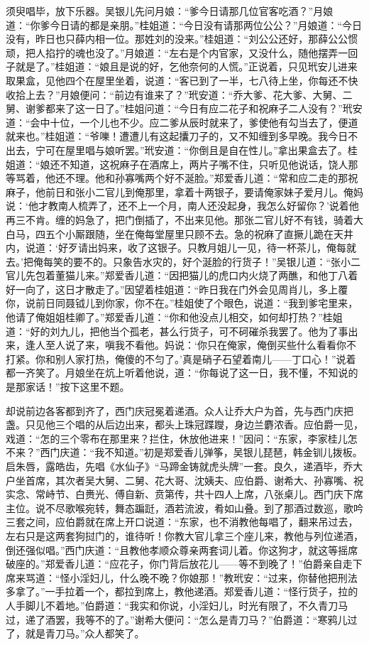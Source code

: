 须臾唱毕，放下乐器。吴银儿先问月娘：“爹今日请那几位官客吃酒？”月娘道：“你爹今日请的都是亲朋。”桂姐道：“今日没有请那两位公公？”月娘道：“今日没有，昨日也只薛内相一位。那姓刘的没来。”桂姐道：“刘公公还好，那薛公公惯顽，把人掐拧的魂也没了。”月娘道：“左右是个内官家，又没什么，随他摆弄一回子就是了。”桂姐道：“娘且是说的好，乞他奈何的人慌。”正说着，只见玳安儿进来取果盒，见他四个在屋里坐着，说道：“客已到了一半，七八待上坐，你每还不快收拾上去？”月娘便问：“前边有谁来了？”玳安道：“乔大爹、花大爹、大舅、二舅、谢爹都来了这一日了。”桂姐问道：“今日有应二花子和祝麻子二人没有？”玳安道：“会中十位，一个儿也不少。应二爹从辰时就来了，爹使他有勾当去了，便道就来也。”桂姐道：“爷嚛！遭遭儿有这起攮刀子的，又不知缠到多早晚。我今日不出去，宁可在屋里唱与娘听罢。”玳安道：“你倒且是自在性儿。”拿出果盒去了。桂姐道：“娘还不知道，这祝麻子在酒席上，两片子嘴不住，只听见他说话，饶人那等骂着，他还不理。他和孙寡嘴两个好不涎脸。”郑爱香儿道：“常和应二走的那祝麻子，他前日和张小二官儿到俺那里，拿着十两银子，要请俺家妹子爱月儿。俺妈说：‘他才教南人梳弄了，还不上一个月，南人还没起身，我怎么好留你？’说着他再三不肯。缠的妈急了，把门倒插了，不出来见他。那张二官儿好不有钱，骑着大白马，四五个小厮跟随，坐在俺每堂屋里只顾不去。急的祝麻了直撅儿跪在天井内，说道：‘好歹请出妈来，收了这银子。只教月姐儿一见，待一杯茶儿，俺每就去。’把俺每笑的要不的。只象告水灾的，好个涎脸的行货子！”吴银儿道：“张小二官儿先包着董猫儿来。”郑爱香儿道：“因把猫儿的虎口内火烧了两醮，和他丁八着好一向了，这日才散走了。”因望着桂姐道：“昨日我在门外会见周肖儿，多上覆你，说前日同聂钺儿到你家，你不在。”桂姐使了个眼色，说道：“我到爹宅里来，他请了俺姐姐桂卿了。”郑爱香儿道：“你和他没点儿相交，如何却打热？”桂姐道：“好的刘九儿，把他当个孤老，甚么行货子，可不砢磪杀我罢了。他为了事出来，逢人至人说了来，嗔我不看他。妈说：‘你只在俺家，俺倒买些什么看看你不打紧。你和别人家打热，俺傻的不匀了。’真是硝子石望着南儿——丁口心！”说着都一齐笑了。月娘坐在炕上听着他说，道：“你每说了这一日，我不懂，不知说的是那家话！”按下这里不题。

却说前边各客都到齐了，西门庆冠冕着递酒。众人让乔大户为首，先与西门庆把盏。只见他三个唱的从后边出来，都头上珠冠蹀躞，身边兰麝浓香。应伯爵一见，戏道：“怎的三个零布在那里来？拦住，休放他进来！”因问：“东家，李家桂儿怎不来？”西门庆道：“我不知道。”初是郑爱香儿弹筝，吴银儿琵琶，韩金钏儿拨板。启朱唇，露皓齿，先唱《水仙子》“马蹄金铸就虎头牌”一套。良久，递酒毕，乔大户坐首席，其次者吴大舅、二舅、花大哥、沈姨夫、应伯爵、谢希大、孙寡嘴、祝实念、常峙节、白赉光、傅自新、贲第传，共十四人上席，八张桌儿。西门庆下席主位。说不尽歌喉宛转，舞态蹁跹，酒若流波，肴如山叠。到了那酒过数巡，歌吟三套之间，应伯爵就在席上开口说道：“东家，也不消教他每唱了，翻来吊过去，左右只是这两套狗挝门的，谁待听！你教大官儿拿三个座儿来，教他与列位递酒，倒还强似唱。”西门庆道：“且教他孝顺众尊亲两套词儿着。你这狗才，就这等摇席破座的。”郑爱香儿道：“应花子，你门背后放花儿——等不到晚了！”伯爵亲自走下席来骂道：“怪小淫妇儿，什么晚不晚？你娘那！”教玳安：“过来，你替他把刑法多拿了。”一手拉着一个，都拉到席上，教他递酒。郑爱香儿道：“怪行货子，拉的人手脚儿不着地。”伯爵道：“我实和你说，小淫妇儿，时光有限了，不久青刀马过，递了酒罢，我等不的了。”谢希大便问：“怎么是青刀马？”伯爵道：“寒鸦儿过了，就是青刀马。”众人都笑了。

